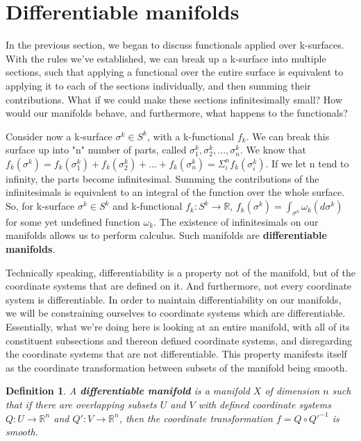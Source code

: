 \documentclass{book}
\newtheorem{defn}[equation]{Definition}
\begin{document}
\section{Differentiable manifolds}

In the previous section, we began to discuss functionals applied over k-surfaces. With the rules we've established, we can break up a k-surface into multiple sections, such that applying a functional over the entire surface is equivalent to applying it to each of the sections individually, and then summing their contributions. What if we could make these sections infinitesimally small? How would our manifolds behave, and furthermore, what happens to the functionals?

Consider now a k-surface $\sigma^k \in S^k$, with a k-functional $f_k$. We can break this surface up into "n" number of parts, called $\sigma^k_1, \sigma^k_2, ..., \sigma^k_n$. We know that $f_k(\sigma^k) = f_k(\sigma^k_1) + f_k(\sigma^k_2) + ... + f_k(\sigma^k_n) = \Sigma^n_if_k(\sigma^k_i)$. If we let n tend to infinity, the parts become infinitesimal. Summing the contributions of the infinitesimals is equivalent to an integral of the function over the whole surface. So, for k-surface $\sigma^k \in S^k$ and k-functional $f_k: S^k \to \mathbb{R}$, $f_k(\sigma^k) = \int_{\sigma^k}\omega_k(d\sigma^k)$ for some yet undefined function $\omega_k$. The existence of infinitesimals on our manifolds allows us to perform calculus. Such manifolds are \textbf{differentiable manifolds}. 

Technically speaking, differentiability is a property not of the manifold, but of the coordinate systems that are defined on it. And furthermore, not every coordinate system is differentiable. In order to maintain differentiability on our manifolds, we will be constraining ourselves to coordinate systems which are differentiable. Essentially, what we're doing here is looking at an entire manifold, with all of its constituent subsections and thereon defined coordinate systems, and disregarding the coordinate systems that are not differentiable. This property manifests itself as the coordinate transformation between subsets of the manifold being smooth. 


\begin{defn}
	A \textbf{differentiable manifold} is a manifold $X$ of dimension $n$ such that if there are overlapping subsets $U$ and $V$ with defined coordinate systems $Q: U \to \mathbb{R}^n$ and $Q': V \to \mathbb{R}^n$, then the coordinate transformation $f = Q \circ Q'^{-1}$ is smooth. 
\end{defn}
\end{document}
